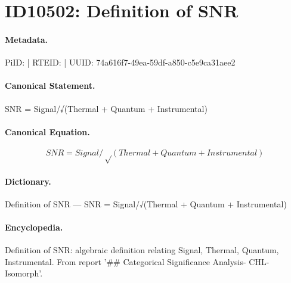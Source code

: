\section*{ID10502: Definition of SNR}
\paragraph{Metadata.}
PiID:  | RTEID:  | UUID: 74a616f7-49ea-59df-a850-c5e9ca31aee2

\paragraph{Canonical Statement.}
SNR = Signal/√(Thermal + Quantum + Instrumental)

\paragraph{Canonical Equation.}
\[
SNR = Signal/√(Thermal + Quantum + Instrumental)
\]

\paragraph{Dictionary.}
Definition of SNR — SNR = Signal/√(Thermal + Quantum + Instrumental)

\paragraph{Encyclopedia.}
Definition of SNR: algebraic definition relating Signal, Thermal, Quantum, Instrumental. From report '\#\# Categorical Significance Analysis- CHL-Isomorph'.
